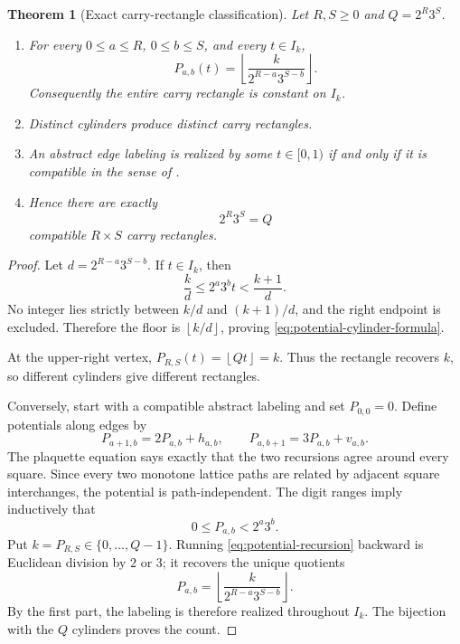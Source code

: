 \documentclass[11pt]{article}
\newtheorem{theorem}{Theorem}[section]
\theoremstyle{definition}
\theoremstyle{remark}
\newcommand{\floor}[1]{\left\lfloor#1\right\rfloor}
\begin{document}
\begin{theorem}[Exact carry-rectangle classification]\label{thm:carry-bijection}
Let $R,S\ge0$ and $Q=2^R3^S$.

\begin{enumerate}
\item For every $0\le a\le R$, $0\le b\le S$, and every $t\in I_k$,
\begin{equation}\label{eq:potential-cylinder-formula}
 P_{a,b}(t)=\floor{\frac{k}{2^{R-a}3^{S-b}}}.
\end{equation}
Consequently the entire carry rectangle is constant on $I_k$.

\item Distinct cylinders produce distinct carry rectangles.

\item An abstract edge labeling is realized by some $t\in[0,1)$ if and only if it
is compatible in the sense of .

\item Hence there are exactly
\begin{equation}\label{eq:number-compatible}
 2^R3^S=Q
\end{equation}
compatible $R\times S$ carry rectangles.
\end{enumerate}
\end{theorem}

\begin{proof}
Let $d=2^{R-a}3^{S-b}$.  If $t\in I_k$, then
\[
 \frac{k}{d}\le 2^a3^b t<\frac{k+1}{d}.
\]
No integer lies strictly between $k/d$ and $(k+1)/d$, and the right endpoint is
excluded.  Therefore the floor is $\floor{k/d}$, proving
\eqref{eq:potential-cylinder-formula}.

At the upper-right vertex, $P_{R,S}(t)=\floor{Qt}=k$.  Thus the rectangle recovers
$k$, so different cylinders give different rectangles.

Conversely, start with a compatible abstract labeling and set $P_{0,0}=0$.  Define
potentials along edges by
\begin{equation}\label{eq:potential-recursion}
 P_{a+1,b}=2P_{a,b}+h_{a,b},
 \qquad
 P_{a,b+1}=3P_{a,b}+v_{a,b}.
\end{equation}
The plaquette equation says exactly that the two recursions agree around every
square.  Since every two monotone lattice paths are related by adjacent square
interchanges, the potential is path-independent.  The digit ranges imply inductively
that
\begin{equation}\label{eq:potential-range}
 0\le P_{a,b}<2^a3^b.
\end{equation}
Put $k=P_{R,S}\in\{0,\ldots,Q-1\}$.  Running
\eqref{eq:potential-recursion} backward is Euclidean division by $2$ or $3$; it
recovers the unique quotients
\[
 P_{a,b}=\floor{\frac{k}{2^{R-a}3^{S-b}}}.
\]
By the first part, the labeling is therefore realized throughout $I_k$.
The bijection with the $Q$ cylinders proves the count.
\end{proof}
\end{document}
